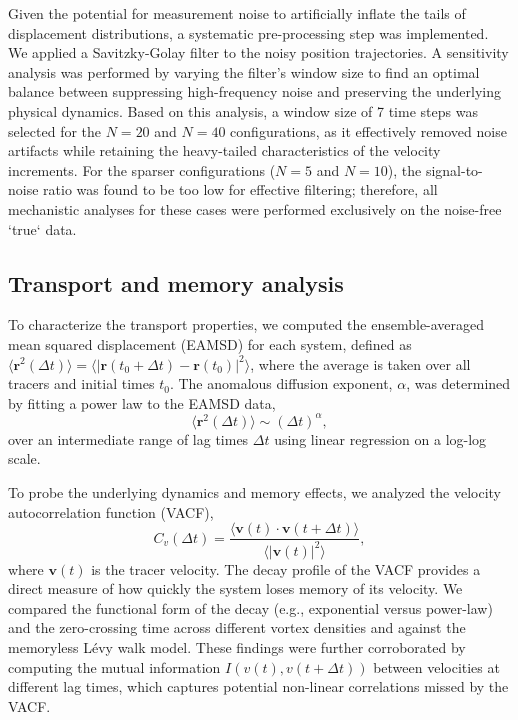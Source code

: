 \documentclass[]{article}
\begin{document}
Given the potential for measurement noise to artificially inflate the tails of displacement distributions, a systematic pre-processing step was implemented. We applied a Savitzky-Golay filter to the noisy position trajectories. A sensitivity analysis was performed by varying the filter's window size to find an optimal balance between suppressing high-frequency noise and preserving the underlying physical dynamics. Based on this analysis, a window size of 7 time steps was selected for the $N=20$ and $N=40$ configurations, as it effectively removed noise artifacts while retaining the heavy-tailed characteristics of the velocity increments. For the sparser configurations ($N=5$ and $N=10$), the signal-to-noise ratio was found to be too low for effective filtering; therefore, all mechanistic analyses for these cases were performed exclusively on the noise-free `true` data.

\subsection{Transport and memory analysis}

To characterize the transport properties, we computed the ensemble-averaged mean squared displacement (EAMSD) for each system, defined as $\langle \mathbf{r}^2(\Delta t) \rangle = \langle |\mathbf{r}(t_0 + \Delta t) - \mathbf{r}(t_0)|^2 \rangle$, where the average is taken over all tracers and initial times $t_0$. The anomalous diffusion exponent, $\alpha$, was determined by fitting a power law to the EAMSD data,
\begin{equation}
\langle \mathbf{r}^2(\Delta t) \rangle \sim (\Delta t)^\alpha,
\end{equation}
over an intermediate range of lag times $\Delta t$ using linear regression on a log-log scale.

To probe the underlying dynamics and memory effects, we analyzed the velocity autocorrelation function (VACF),
\begin{equation}
C_v(\Delta t) = \frac{\langle \mathbf{v}(t) \cdot \mathbf{v}(t + \Delta t) \rangle}{\langle |\mathbf{v}(t)|^2 \rangle},
\end{equation}
where $\mathbf{v}(t)$ is the tracer velocity. The decay profile of the VACF provides a direct measure of how quickly the system loses memory of its velocity. We compared the functional form of the decay (e.g., exponential versus power-law) and the zero-crossing time across different vortex densities and against the memoryless L\'evy walk model. These findings were further corroborated by computing the mutual information $I(v(t), v(t+\Delta t))$ between velocities at different lag times, which captures potential non-linear correlations missed by the VACF.
\end{document}

